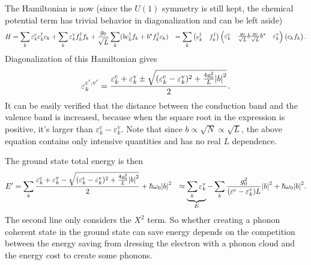 \documentclass[hyperref, a4paper]{article}
\def\\{}%
\begin{document}
The Hamiltonian is now 
(since the $U(1)$ symmetry is still kept, 
the chemical potential term has trivial behavior in diagonalization 
and can be left aside)
\begin{equation}
    \begin{aligned}
        H &= \sum_k \varepsilon^{\text{c}}_k c^\dagger_k c_k
        + \sum_k \varepsilon^{\text{v}}_k f^\dagger_k f_k 
        + \frac{g_0}{\sqrt{L}} \sum_k (b c^\dagger_k f_k + b^* f^\dagger_k c_k) \\
        &= \sum_k \pmqty{
            c^\dagger_k & f_k^\dagger
        } \pmqty{
            \varepsilon^{\text{c}}_k & \frac{g_0}{\sqrt{L}} b \\
            \frac{g_0}{\sqrt{L}} b^* & \varepsilon^{\text{v}}_k
        } \pmqty{
            c_k \\ f_k
        } .
    \end{aligned}
\end{equation}
Diagonalization of this Hamiltonian gives
\begin{equation}
    \varepsilon_k^{\text{c}', \text{v}'} = \frac{
        \varepsilon^{\text{c}}_k + \varepsilon^{\text{v}}_k 
        \pm \sqrt{
            (\varepsilon^{\text{c}}_k - \varepsilon^{\text{v}}_k)^2 
            + \frac{4 g_0^2}{L} \abs{b}^2
        }
    }{2}.
    \label{eq:diag-energy}
\end{equation}
It can be easily verified that 
the distance between the conduction band and the valence band is increased,
because when the square root in the expression is positive, 
it's larger than $\varepsilon^{\text{c}}_k - \varepsilon^{\text{v}}_k$.
Note that since $b \propto \sqrt{N} \propto \sqrt{L}$,
the above equation contains only intensive quantities 
and has no real $L$ dependence.

The ground state total energy is then 
\begin{equation}
    \begin{aligned}
        E' &= \sum_k \frac{
            \varepsilon^{\text{c}}_k + \varepsilon^{\text{v}}_k 
            - \sqrt{
                (\varepsilon^{\text{c}}_k - \varepsilon^{\text{v}}_k)^2 
                + \frac{4 g_0^2}{L} \abs{b}^2
            }
        }{2} + \hbar \omega_0 \abs{b}^2 \\
        &\approx \underbrace{\sum_k \varepsilon^{\text{v}}_k}_{E} 
        - \sum_k \frac{g_0^2}{(\varepsilon^{\text{c}} - \varepsilon^{\text{v}}_k) L} \abs{b}^2
        + \hbar \omega_0 \abs{b}^2.
    \end{aligned}
    \label{eq:ground-state-phonon}
\end{equation}
The second line only considers the $X^2$ term.
So whether creating a phonon coherent state in the ground state can save energy 
depends on the competition between 
the energy saving from dressing the electron 
with a phonon cloud 
and the energy cost to create some phonons.
\end{document}
